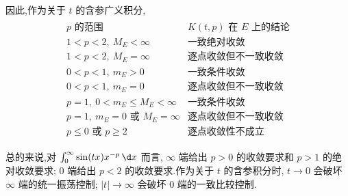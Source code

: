 \begin{example}
\begin{enumerate}
		因此,作为关于 $t$ 的含参广义积分,
		\begin{gather*}
		\begin{array}{c|c}
			p\text{ 的范围}&K(t,p)\text{ 在 }E\text{ 上的结论}\\ \hline
			1<p<2,\ M_E<\infty&\text{一致绝对收敛}\\[3pt]
			1<p<2,\ M_E=\infty&\text{逐点收敛但不一致收敛}\\[3pt]
			0<p<1,\ m_E>0&\text{一致条件收敛}\\[3pt]
			0<p<1,\ m_E=0&\text{逐点收敛但不一致收敛}\\[3pt]
			p=1,\ 0<m_E\leq M_E<\infty&\text{一致条件收敛}\\[3pt]
			p=1,\ m_E=0\text{ 或 }M_E=\infty&\text{逐点收敛但不一致收敛}\\[3pt]
			p\leq0\text{ 或 }p\geq2&\text{逐点收敛性不成立}
		\end{array}
		\end{gather*}
	\end{enumerate}
\end{example}

总的来说,对 $\int_0^\infty \sin(tx)x^{-p}\,\d x$ 而言, $\infty$ 端给出 $p>0$ 的收敛要求和 $p>1$ 的绝对收敛要求; $0$ 端给出 $p<2$ 的收敛要求.作为关于 $t$ 的含参积分时, $t\to0$ 会破坏 $\infty$ 端的统一振荡控制; $|t|\to\infty$ 会破坏 $0$ 端的一致比较控制.

